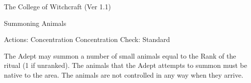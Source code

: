 \begin{Chapter}{The College of Witchcraft (Ver 1.1)}
\begin{ritual}[R-5]{Summoning Animals }

Actions: Concentration 
Concentration Check: Standard 
\begin{effects}
The Adept may summon a number of small animals equal to the Rank of
the ritual (1 if unranked).  The animals that the Adept attempts to
summon must be native to the area.  The animals are not controlled in
any way when they arrive.
\end{effects}
\end{ritual}

\end{Chapter}
